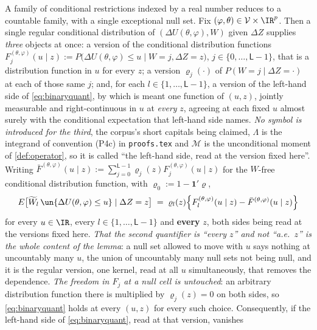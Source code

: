 \begin{lemma}\label{lem:quantu}
A family of conditional restrictions indexed by a real number reduces to a countable family, with a
single exceptional null set.
Fix $(\varphi,\theta)\in\mathcal V\times\IR^{p}$. Then a single regular conditional distribution of
$(\Delta U(\theta,\varphi),W)$ given $\Delta Z$ supplies \emph{three} objects at once: a version of the
conditional distribution functions
$F^{(\theta,\varphi)}_j(u\mid z):=P\big(\Delta U(\theta,\varphi)\le u\mid W=j,\Delta Z=z\big)$,
$j\in\{0,\dots,\mathsf L-1\}$, that is a distribution function in $u$ for every $z$; a version
$\varrho_j(\cdot)$ of $P(W=j\mid\Delta Z=\cdot)$ at each of those same $j$; and, for each
$l\in\{1,\dots,\mathsf L-1\}$, a version
of the left-hand side of \eqref{eq:binaryquant}, by which is meant one function of $(u,z)$, jointly
measurable and right-continuous in $u$ at \emph{every} $z$, agreeing at each fixed $u$ almost surely
with the conditional expectation that left-hand side names. \emph{No symbol is introduced for the
third}, the corpus's short capitals being claimed, $\Lambda$ is the integrand of convention
\textup{(P4c)} in \texttt{proofs.tex} and $\mathcal M$ is the unconditional moment of
\cref{def:operator}, so it is called ``the left-hand side, read at the version
fixed here''. Writing
$\bar F^{(\theta,\varphi)}(u\mid z):=\sum_{j=0}^{\mathsf L-1}\varrho_j(z)F^{(\theta,\varphi)}_j(u\mid z)$
for the $W$-free conditional distribution function, with $\varrho_0:=1-\mathbf 1'\varrho$,
\begin{equation}\label{eq:binaryquant}
E\big[\widetilde W_l\,\un\{\Delta U(\theta,\varphi)\le u\}\mid\Delta Z=z\big]
\;=\;\varrho_l(z)\Big\{F^{(\theta,\varphi)}_l(u\mid z)-\bar F^{(\theta,\varphi)}(u\mid z)\Big\}
\end{equation}
for every $u\in\IR$, every $l\in\{1,\dots,\mathsf L-1\}$ and \textbf{every} $z$, both sides being read
at the versions fixed here. \emph{That the second quantifier is ``every $z$'' and not
``a.e.\ $z$'' is the whole content of the lemma}: a null set allowed to move with $u$ says nothing at
uncountably many $u$, the union of uncountably many null sets not being null, and it is the regular
version, one kernel, read at all $u$ simultaneously, that removes the dependence. \emph{The
freedom in $F_j$ at a null cell is untouched}: an arbitrary distribution function there is multiplied by
$\varrho_j(z)=0$ on both sides, so \eqref{eq:binaryquant} holds at every $(u,z)$ for every such choice.
Consequently, if the left-hand side of \eqref{eq:binaryquant}, read at that version, vanishes

\end{lemma}

